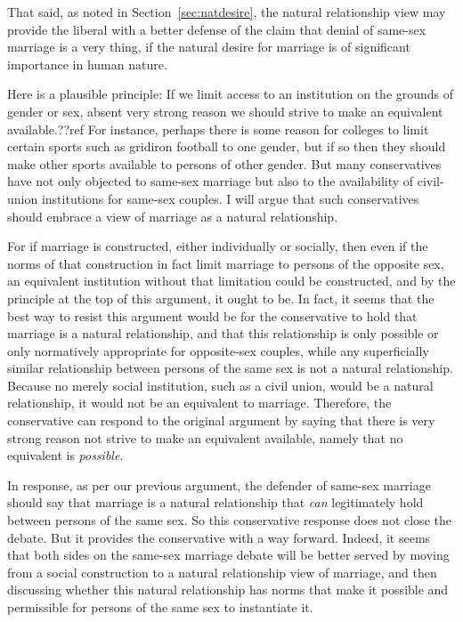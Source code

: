 That said, as noted in Section~\ref{sec:natdesire}, the natural relationship view may provide the liberal with 
a better defense of the claim that denial of same-sex marriage is a very thing, if the natural desire for marriage
is of significant importance in human nature.

Here is a plausible principle: If we limit access to an institution on the grounds of gender or sex, absent very strong reason we should strive to make an equivalent
available.??ref For instance, perhaps there is some reason for colleges to limit certain sports such as gridiron football to one gender, but if so then they should make other sports available
to persons of other gender.
But many conservatives have not only objected to same-sex marriage but also to the availability of civil-union institutions for same-sex couples. I will argue that
such conservatives should embrace a view of marriage as a natural relationship.

For if marriage is constructed, either individually or socially, then even if the norms of that construction in fact limit marriage to persons of the opposite sex, an
equivalent institution without that limitation could be constructed, and by the principle at the top of this argument, it ought to be. In fact, it seems that
the best way to resist this argument would be for the conservative to hold that marriage is a natural relationship, and that this relationship is only possible
or only normatively appropriate for opposite-sex couples, while any superficially similar relationship between persons of the same sex is not a natural relationship.
Because no merely social institution, such as a civil union, would be a natural relationship, it would not be an equivalent to marriage. Therefore, the conservative can respond to the
original argument by saying that there is very strong reason not strive to make an equivalent available, namely that no equivalent is \textit{possible}.

In response, as per our previous argument, the defender of same-sex marriage should say that marriage is a natural relationship that \textit{can} legitimately
hold between persons of the same sex. So this conservative response does not close the debate. But it provides the conservative with a way forward. Indeed,
it seems that both sides on the same-sex marriage debate will be better served by moving from a social construction to a natural relationship view of marriage, and then discussing whether
this natural relationship has norms that make it possible and permissible for persons of the same sex to instantiate it.

